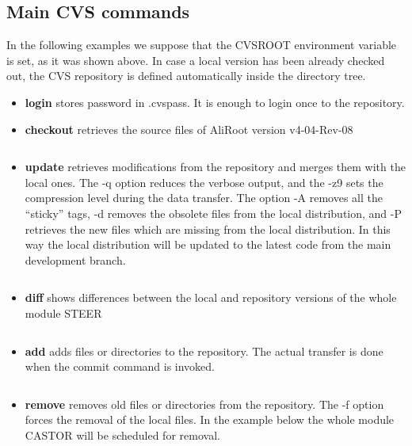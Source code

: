 \documentclass[12pt,a4paper,twoside]{article}
\begin{document}
\subsection{Main CVS commands}

In  the following  examples we  suppose that  the  CVSROOT environment
variable is  set, as it was shown  above. In case a  local version has
been already checked out,  the CVS repository is defined automatically
inside the directory tree.

\begin{itemize}
\item\textbf{login} stores password in .cvspass. It is enough to login
  once to the repository.

\item\textbf{checkout} retrieves the source files of AliRoot version v4-04-Rev-08
  \begin{lstlisting}[language=sh]
    % cvs co -r v4-04-Rev-08 AliRoot
  \end{lstlisting}

\item\textbf{update} retrieves  modifications from the  repository and
  merges them with  the local ones. The -q  option reduces the verbose
  output,  and the  -z9 sets  the  compression level  during the  data
  transfer. The option -A removes  all the ``sticky'' tags, -d removes
  the obsolete files from the local distribution, and -P retrieves the
  new files which are missing from the local distribution. In this way
  the local distribution  will be updated to the  latest code from the
  main development branch.
  \begin{lstlisting}[language=sh]
    % cvs -qz9 update -AdP STEER
  \end{lstlisting}

\item\textbf{diff} shows differences between the local and repository
  versions of the whole module STEER
  \begin{lstlisting}[language=sh]
    % cvs -qz9 diff STEER
  \end{lstlisting}

\item \textbf{add} adds files or directories to the repository. The
  actual transfer is done when the commit command is invoked.
  \begin{lstlisting}[language=sh]
    % cvs -qz9 add AliTPCseed.*
  \end{lstlisting}

\item\textbf{remove}  removes  old   files  or  directories  from  the
  repository. The -f option forces  the removal of the local files. In
  the  example below  the whole  module CASTOR  will be  scheduled for
  removal.
  \begin{lstlisting}[language=sh]
    % cvs remove -f CASTOR
  \end{lstlisting}


\end{itemize}
\end{document}
